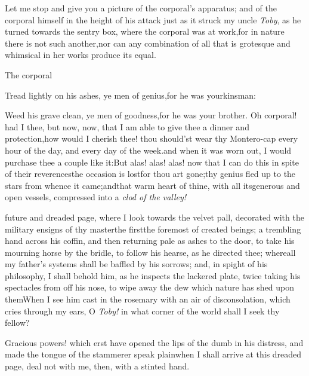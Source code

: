 \documentclass{article}
\begin{document}
Let me stop and give you a picture of the corporal’s apparatus; and of the corporal
himself in the height of his attack just as it struck my uncle \textit{Toby}, as he
turned towards the sentry box, where the corporal was at work,\tsh for in nature
there is not such another,\tsh\break nor can any combination of all that is
grotesque and whimsical in her works produce its equal.

The corporal\tsh

\newpage
\tsh Tread lightly on his ashes, ye men of
genius,\tsh for he was your\break kinsman:

Weed his grave clean, ye men of goodness,\tsk for he was your
brother.\tsk\break
Oh corporal! had I thee, but now,\tsk\break
now, that I am able to give thee a dinner and
protection,\tsk how would I cherish thee! thou should’st
wear thy Mon\-tero-cap every hour of the day, and every day of the
week.\tsk and when it was worn out, I would purchase thee a
couple like it:\tsh But alas! alas! alas!\break
now that I can do this in spite of their reverences\tsk the occasion is
lost\tsk for thou art gone;\tsk thy genius fled up to the stars
from whence it came;\tsk and\break that warm heart of thine, with all
its\break generous and open vessels, compressed into a \textit{clod of the
valley!}

\newpage
\noindent
{}
future and dreaded page, where I look towards the velvet pall, decorated
with the military ensigns of thy master\tsk the\break
first\tsk the foremost of created beings;\break
{}
\break
a trembling hand across his coffin, and\break
then returning pale as ashes to the door, to take his mourning horse by the bridle,
to follow his hearse, as he directed thee;\break
\tsh where\tsk all my father’s systems
shall be baffled by his sorrows; and, in spight\break
of his philosophy, I shall behold
him, as he inspects the lackered plate, twice taking his spectacles from off his
nose, to wipe away the dew which nature has shed upon them\tsh When I see him cast
in the rosemary with an air of disconsolation, which cries through my ears,\break
\tsh O \textit{Toby!} in what corner of the world shall I seek thy fellow?

\newpage
\tsh Gracious powers! which erst have opened the lips
of the dumb in his distress, and made the tongue of the stammerer
speak plain\tsk when I shall arrive at this dreaded page, deal
not with me, then, with a stinted hand.
\end{document}
